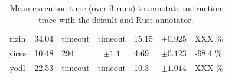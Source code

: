\begin{table}[h]
{\begin{tabular}{ccgcgcg}
            rizin                                & 34.04                                & timeout                                   & timeout                                & 15.15                     & $ \pm 0.925 $ & XXX \%    \\
            yices                                & 10.48                                & 294                                       & $ \pm 1.1 $                            & 4.69                      & $ \pm 0.123 $ & -98.4 \%  \\
            yodl                                 & 22.53                                & timeout                                   & timeout                                & 10.3                      & $ \pm 1.014 $ & XXX \%    \\
            \bottomrule
        \end{tabular}
    }
    \caption{Mean execution time (over 3 runs) to annotate instruction trace with the default and Rust annotator.}
    \label{table:annotate-instruction-trace-3}
\end{table}